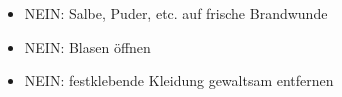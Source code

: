 





{%
\begin{itemize}
    \item[\Irritant] NEIN: Salbe, Puder, etc. auf frische 
    Brandwunde \cite {emergency9,PHTLS6}
    \item[\Irritant] NEIN: Blasen öffnen \cite{emergency9}
    \item[\Irritant] NEIN: festklebende Kleidung gewaltsam entfernen
\end{itemize}
}{

}{}{}{}


\cite{Kamolz2009,Verbrennungsmed2009Praehosp,Beneker2004,Loennecker2001,TertialeNotfallIntensivmed1}



\subsection{}
\label{topic:inhalationstrauma}


